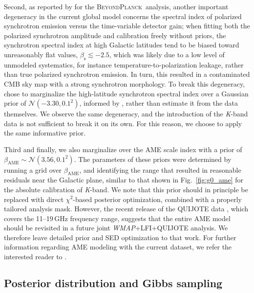 \documentclass[twocolumn]{../../common/aa}
\def\WMAP{\emph{WMAP}}
\newcommand{\BP}{\textsc{BeyondPlanck}}
\newcommand{\K}[0]{\textit K}
\begin{document}
Second, as reported by \citet{bp14} for the \BP\ analysis, another important degeneracy in the current global model concerns the spectral index of polarized synchrotron emission versus the time-variable detector gain; when fitting both the polarized synchrotron amplitude and calibration freely without priors, the synchrotron spectral index at high Galactic latitudes tend to be biased toward unreasonably flat values, $\beta_\mathrm s \lesssim -2.5$, which was likely due to a low level of unmodeled systematics, for instance temperature-to-polarization leakage, rather than true polarized synchrotron emission. In turn, this resulted in a contaminated CMB sky map with a strong synchrotron morphology. To break this degeneracy, \citet{bp14} chose to marginalize the high-latitude synchrotron spectral index over a Gaussian prior of $\mathcal N(-3.30,0.1^2)$, informed by \citet{planck2016-l05}, rather than estimate it from the data themselves. We observe the same degeneracy, and the introduction of the \K-band data is not sufficient to break it on its own. For this reason, we choose to apply the same informative prior.

Third and finally, we also marginalize over the AME scale index with a prior of $\beta_{\mathrm{AME}}\sim\mathcal N(3.56, 0.1^2)$. The parameters of these priors were determined by running a grid over $\beta_{\mathrm{AME}}$, and identifying the range that resulted in reasonable residuals near the Galactic plane, similar to that shown in Fig.~\ref{fig:g0_ame} for the absolute calibration of \K-band. We note that this prior should in principle be replaced with direct $\chi^2$-based posterior optimization, combined with a properly tailored analysis mask. However, the recent release of the QUIJOTE data \citep{QUIJOTE_IV}, which covers the 11--19\,GHz frequency range, suggests that the entire AME model should be revisited in a future joint \WMAP+LFI+QUIJOTE analysis. We therefore leave detailed prior and SED optimization to that work. For further information regarding AME modeling with the current dataset, we refer the interested reader to \citet{watts2023_ame}.

\subsection{Posterior distribution and Gibbs sampling}
\end{document}
